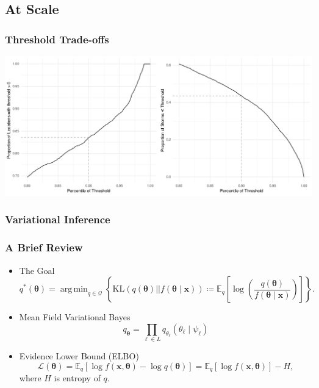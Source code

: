 \documentclass[aspectratio=169,10pt]{beamer}
\DeclareMathOperator*{\argmin}{arg\,min}
\newlength{\frametextheight}
\begin{document}
\subsection*{At Scale}

\begin{frame}
    \frametitle{Threshold Trade-offs}
    \label{exapg:thresholdtradeoffs}
    \begin{center}
        \includegraphics[height = 0.99\frametextheight]{./ch3/plots/explore_threshold}
    \end{center}
\end{frame} %

\subsubsection{Variational Inference}

\begin{frame}
    \frametitle{A Brief Review}
    \label{exapg:variationalinferencereview}
    \begin{itemize}
    \item The Goal
        \[
            q^*(\bm{\theta}) = \argmin_{q\in\mathcal{Q}}\left\lbrace
            \text{KL}\left(q(\bm{\theta})||f(\bm{\theta}\mid\bm{x})\right) 
            \coloneqq
            \mathbb{E}_{q}\left[\log\left(
            \frac{q(\bm{\theta})}{f(\bm{\theta}\mid\bm{x})}
            \right)\right]
            \right\rbrace.
        \]
    \item Mean Field Variational Bayes
        \[
            q_{\bm{\theta}} = \prod_{\ell \in L}
                q_{\theta_{\ell}}(\theta_{\ell}\mid\psi_{\ell})
        \]
    \item Evidence Lower Bound (ELBO)
        \[
            \mathcal{L}(\bm{\theta}) = 
                \mathbb{E}_q\left[\log f(\bm{x},\bm{\theta}) - 
                \log q(\bm{\theta})\right] 
            = \mathbb{E}_q[\log f(\bm{x},\bm{\theta})] - H,
        \]
    where $H$ is entropy of $q$.
    \end{itemize}
\end{frame} %
\end{document}
